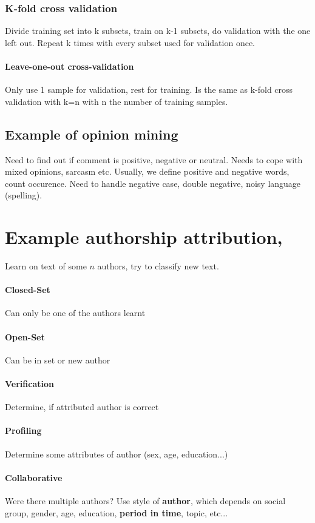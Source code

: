 \documentclass[11pt]{article}
\begin{document}
\subsubsection{K-fold cross validation}
Divide training set into k subsets, train on k-1 subsets, do validation with the one left out. Repeat k times with every subset used for validation once.
\paragraph{Leave-one-out cross-validation}
Only use 1 sample for validation, rest for training. Is the same as k-fold cross validation
with k=n with n the number of training samples.

\subsection{Example of opinion mining}
Need to find out if comment is positive, negative or neutral. Needs to cope with mixed
opinions, sarcasm etc. Usually, we define positive and negative words, count occurence. 
Need to handle negative case, double negative, noisy language (spelling).

\section{Example authorship attribution, }
Learn on text of some $n$ authors, try to classify new text. 
\paragraph{Closed-Set} Can only be one of the authors learnt
\paragraph{Open-Set} Can be in set or new author
\paragraph{Verification} Determine, if attributed author is correct
\paragraph{Profiling} Determine some attributes of author (sex, age, education...)
\paragraph{Collaborative} Were there multiple authors?
Use style of \textbf{author}, which depends on social group, gender, age, education, \textbf{period in
time}, topic, etc...
\end{document}
